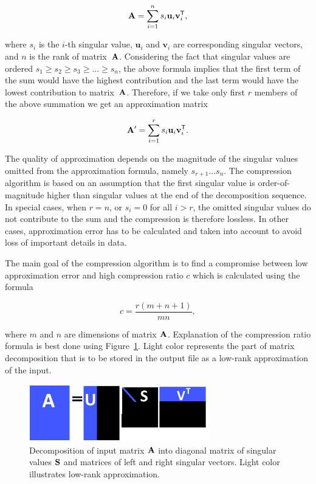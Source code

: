 \begin{equation}
\mathbf{A}=\sum_{i=1}^{n} s_{i}\mathbf{u}_{i}\mathbf{v}_{i}^{\mathsf{T}},
\label{eq:svd-expansion}
\end{equation}

\noindent
where $s_i$ is the $i$-th singular value, $\mathbf{u}_i$ and $\mathbf{v}_i$ are corresponding singular vectors, and $n$ is the rank of matrix~$\mathbf{A}$. Considering the fact that singular values are ordered $s_{1} \geq s_{2} \geq s_{3} \geq ... \geq s_{n}$, the above formula implies that the first term of the sum would have the highest contribution and the last term would have the lowest contribution to matrix~$\mathbf{A}$. Therefore, if we take only first $r$ members of the above summation we get an approximation matrix

\begin{equation}
\mathbf{A'}=\sum_{i=1}^{r} s_{i}\mathbf{u}_{i}\mathbf{v}_{i}^{\mathsf{T}}.
\label{eq:svd-approx-expansion}
\end{equation}

The quality of approximation depends on the magnitude of the singular values omitted from the approximation formula, namely $s_{r+1} ...  s_{n}$. The compression algorithm is based on an assumption that the first singular value is order-of-magnitude higher than singular values at the end of the decomposition sequence. In special cases, when $r=n$, or $s_{i}=0$ for all $i > r$, the omitted singular values do not contribute to the sum and the compression is therefore lossless. In other cases, approximation error has to be calculated and taken into account to avoid loss of important details in data.

The main goal of the compression algorithm is to find a compromise between low approximation error and high compression ratio $c$ which is calculated using the formula

\begin{equation}
c=\frac{r(m+n+1)}{m n},
\label{eq:cr-def}
\end{equation}

\noindent
where $m$ and $n$ are dimensions of matrix $\mathbf{A}$. Explanation of the compression ratio formula is best done using Figure~\ref{fig:lowrank_svd}. Light color represents the part of matrix decomposition that is to be stored in the output file as a low-rank approximation of the input.

\begin{figure}[H]
\centering
\includegraphics[width=0.7\textwidth]{figures/appendix-SVD/low_rank_decomposition_diagram}
\decoRule
\caption{Decomposition of input matrix $\mathbf{A}$ into diagonal matrix of singular values $\mathbf{S}$ and matrices of left and right singular vectors. Light color illustrates low-rank approximation.}
\label{fig:lowrank_svd}
\end{figure}

